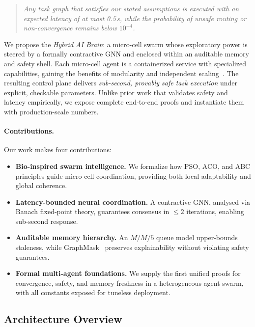 \documentclass{article}
\begin{document}
    \begin{quote}
    \emph{Any task graph that satisfies our stated assumptions is executed with an expected latency of at most 0.5\,s, while the probability of unsafe routing or non-convergence remains below $10^{-4}$.}
    \end{quote}
    
    We propose the \emph{Hybrid AI Brain}: a micro-cell swarm whose exploratory power is steered by a formally contractive GNN and enclosed within an auditable memory and safety shell. Each micro-cell agent is a containerized service with specialized capabilities, gaining the benefits of modularity and independent scaling~\cite{newman2015building}. The resulting control plane delivers \emph{sub-second, provably safe task execution} under explicit, checkable parameters. Unlike prior work that validates safety and latency empirically, we expose complete end-to-end proofs and instantiate them with production-scale numbers.
    
    \paragraph{Contributions.} Our work makes four contributions:
    \begin{itemize}[topsep=2pt,itemsep=2pt,parsep=0pt]
    \item \textbf{Bio-inspired swarm intelligence.} We formalize how PSO, ACO, and ABC principles guide micro-cell coordination, providing both local adaptability and global coherence.
    \item \textbf{Latency-bounded neural coordination.} A contractive GNN, analysed via Banach fixed-point theory, guarantees consensus in $\leq 2$ iterations, enabling sub-second response.
    \item \textbf{Auditable memory hierarchy.} An $M/M/5$ queue model upper-bounds staleness, while GraphMask~\cite{schlichtkrull2021interpreting} preserves explainability without violating safety guarantees.
    \item \textbf{Formal multi-agent foundations.} We supply the first unified proofs for convergence, safety, and memory freshness in a heterogeneous agent swarm, with all constants exposed for tuneless deployment.
    \end{itemize}
    
    \subsection{Architecture Overview}
    
\end{document}
